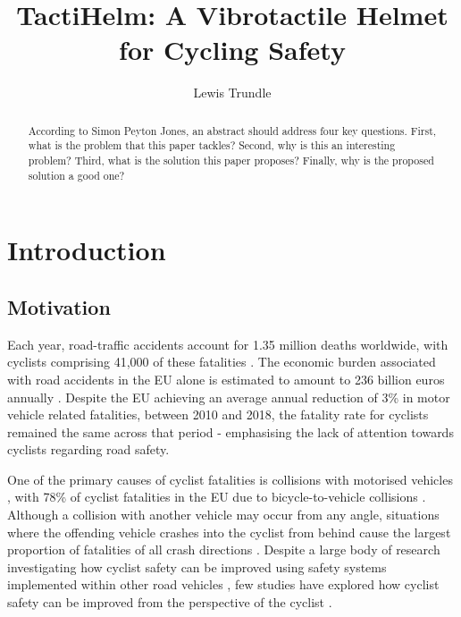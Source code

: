 \documentclass{mpaper}
\begin{document}
\title{TactiHelm: A Vibrotactile Helmet for Cycling Safety}
\author{Lewis Trundle}

\maketitle

\begin{abstract}
According to Simon Peyton Jones, an abstract should address
four key questions. First, what is the problem that this
paper tackles? Second, why is this an interesting problem?
Third, what is the solution this paper proposes?
Finally, why is the proposed solution a good one?
\end{abstract}

\section{Introduction}

\subsection{Motivation}
Each year, road-traffic accidents account for 1.35 million deaths worldwide, with cyclists comprising 41,000 of these fatalities \cite{world2018global}. The economic burden associated with road accidents in the EU alone is estimated to amount to 236 billion euros annually \cite{costoftransport}. Despite the EU achieving an average annual reduction of 3\% in motor vehicle related fatalities, between 2010 and 2018, the fatality rate for cyclists remained the same across that period \cite{adminaite2020safe} - emphasising the lack of attention towards cyclists regarding road safety.

One of the primary causes of cyclist fatalities is collisions with motorised vehicles \cite{BIL20101632}, with 78\% of cyclist fatalities in the EU due to bicycle-to-vehicle collisions \cite{adminaite2015making}. Although a collision with another vehicle may occur from any angle, situations where the offending vehicle crashes into the cyclist from behind cause the largest proportion of fatalities of all crash directions \cite{BIL20101632}. Despite a large body of research investigating how cyclist safety can be improved using safety systems implemented within other road vehicles \cite{scholliers2014potential, SILLA2017134, cieslik2019improving, 7929602, 10.1145/3434770.3459732}, few studies have explored how cyclist safety can be improved from the perspective of the cyclist \cite{10.1145/3490099.3511127, STROHAEKER2022151}. 
\end{document}
